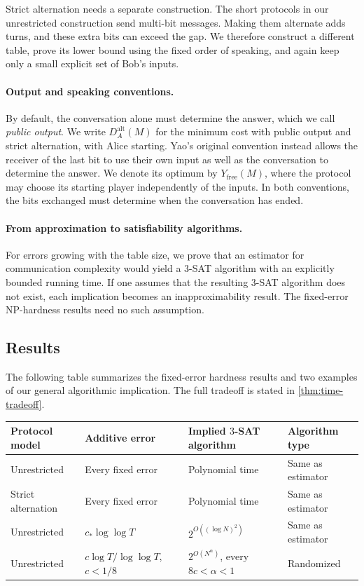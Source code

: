 \documentclass[11pt,letterpaper]{article} \usepackage[utf8]{inputenc}
\theoremstyle{plain} \newtheorem{theorem}{Theorem}[section]
\theoremstyle{definition} \newaliascnt{definition}{theorem}
\begin{document}
Strict alternation needs a separate construction. The short protocols in our
unrestricted construction send multi-bit messages. Making them alternate
adds turns, and these extra bits can exceed the gap. We therefore
construct a different table, prove its lower bound using the fixed order of
speaking, and again keep only a small explicit set of Bob's inputs.

\paragraph{Output and speaking conventions.}
By default, the conversation alone must determine the answer, which we call
\emph{public output}. We write $D_A^{\mathrm{alt}}(M)$ for the minimum
cost with public output and strict alternation, with Alice starting.
Yao's original convention instead allows the receiver of the last bit
to use their own input as well as the conversation to determine the
answer. We denote its optimum by $Y_{\mathrm{free}}(M)$, where the
protocol may choose its starting player independently of the inputs.
In both conventions, the bits exchanged must determine when the
conversation has ended.

\paragraph{From approximation to satisfiability algorithms.}
For errors growing with the table size, we prove that an estimator for
communication complexity would yield a $3$-SAT algorithm with an
explicitly bounded running time.
If one assumes that the resulting $3$-SAT algorithm does not exist, each
implication becomes an inapproximability result. The fixed-error
NP-hardness results need no such assumption.

\subsection{Results}
\label{sec:results}

The following table summarizes the fixed-error hardness results and two
examples of our general algorithmic implication. The full tradeoff is
stated in \cref{thm:time-tradeoff}.

\begin{center}
\small
\begin{tabular}{@{}p{.18\linewidth}p{.27\linewidth}p{.25\linewidth}p{.19\linewidth}@{}}
\toprule
Protocol model & Additive error & Implied $3$-SAT algorithm & Algorithm type\\
\midrule
Unrestricted & Every fixed error & Polynomial time & Same as estimator\\
\addlinespace
Strict alternation & Every fixed error & Polynomial time & Same as estimator\\
\addlinespace
Unrestricted & $c_*\log\log T$ & $2^{O((\log N)^2)}$ & Same as estimator\\
\addlinespace
Unrestricted & $c\log T/\log\log T$, $c<1/8$ & $2^{O(N^\alpha)}$, every $8c<\alpha<1$ & Randomized\\
\bottomrule
\end{tabular}
\end{center}
\end{document}
